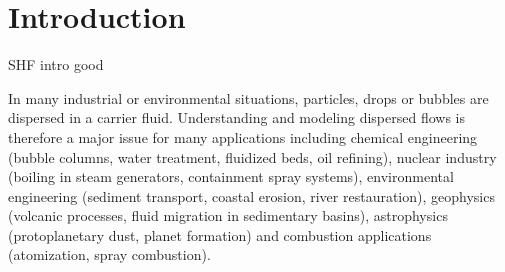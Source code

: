 \section{Introduction}

SHF intro good

In many industrial or environmental situations, particles, drops or bubbles are dispersed in a
carrier fluid. Understanding and modeling dispersed flows is therefore a major issue for many
applications including chemical engineering (bubble columns, water treatment, fluidized beds,
oil refining), nuclear industry (boiling in steam generators, containment spray systems),
environmental engineering (sediment transport, coastal erosion, river restauration), geophysics
(volcanic processes, fluid migration in sedimentary basins), astrophysics (protoplanetary dust,
planet formation) and combustion applications (atomization, spray combustion).